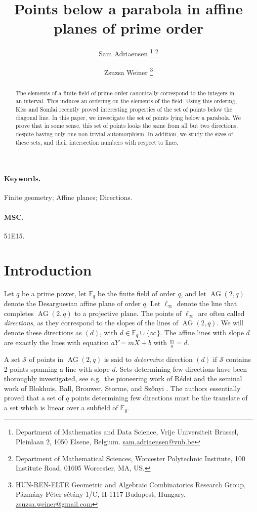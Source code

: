 \documentclass[a4paper, 12pt]{article}
\title{Points below a parabola in affine planes of prime order}
\author{
 Sam Adriaensen
  \thanks{Department of Mathematics and Data Science, Vrije Universiteit Brussel, Pleinlaan 2, 1050 Elsene, Belgium. \href{mailto:sam.adriaensen@vub.be}{sam.adriaensen@vub.be}} 
  \thanks{Department of Mathematical Sciences, Worcester Polytechnic Institute, 100 Institute Road, 01605 Worcester, MA, US.} 
 \and Zsuzsa Weiner
  \thanks{HUN-REN-ELTE Geometric and Algebraic Combinatorics Research Group, P\'azm\'any P\'eter s\'et\'any 1/C, H-1117 Budapest, Hungary.
   \href{mailto:zsuzsa.weiner@gmail.com}{zsuzsa.weiner@gmail.com}} 
}
\date{}
\theoremstyle{definition}
\newcommand{\FF}{\mathbb F}
\newcommand{\ms}{\mathcal S}
\DeclareMathOperator{\AG}{AG}
\newcommand{\ag}{\AG}
\begin{document}
\maketitle

\begin{abstract}
 The elements of a finite field of prime order canonically correspond to the integers in an interval.
 This induces an ordering on the elements of the field.
 Using this ordering, Kiss and Somlai recently proved interesting properties of the set of points below the diagonal line.
 In this paper, we investigate the set of points lying below a parabola.
 We prove that in some sense, this set of points looks the same from all but two directions, despite having only one non-trivial automorphism.
 In addition, we study the sizes of these sets, and their intersection numbers with respect to lines.
\end{abstract}

\paragraph{Keywords.} Finite geometry; Affine planes; Directions. 

\paragraph{MSC.} 51E15. %

\section{Introduction}
Let $q$ be a prime power, let $\FF_q$ be the finite field of order $q$, and let $\ag(2,q)$ denote the Desarguesian affine plane of order $q$.
Let $\ell_\infty$ denote the line that completes $\ag(2,q)$ to a projective plane.
The points of $\ell_\infty$ are often called \emph{directions}, as they correspond to the slopes of the lines of $\ag(2,q)$.
We will denote these directions as $(d)$, with $d \in \FF_q \cup \{\infty\}$.
The affine lines with slope $d$ are exactly the lines with equation $aY = mX + b$ with $\frac m a = d$.

A set $\ms$ of points in $\ag(2,q)$ is said to \emph{determine} direction $(d)$ if $\ms$ contains 2 points spanning a line with slope $d$.
Sets determining few directions have been thoroughly investigated, see e.g.\ the pioneering work of Rédei \cite{Redei:70} and the seminal work of Blokhuis, Ball, Brouwer, Storme, and Sz\H onyi \cite{BBBSS:99,Ball:03}.
The authors essentially proved that a set of $q$ points determining few directions must be the translate of a set which is linear over a subfield of $\FF_q$.
\end{document}
